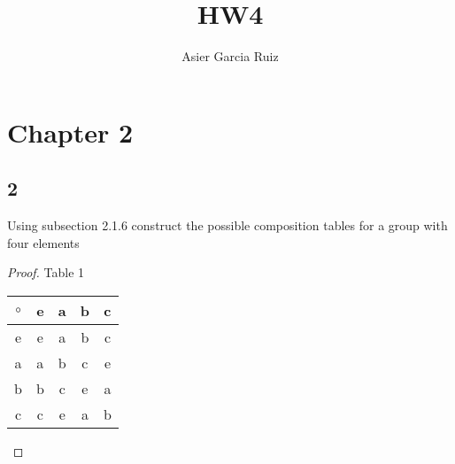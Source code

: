 \documentclass{article}
\title{HW4}
\author{Asier Garcia Ruiz}
\begin{document}
\maketitle

\section*{Chapter 2}
\subsection*{2}
Using subsection 2.1.6 construct the possible composition tables for a group with
four elements

\begin{proof}
    Table 1
    \begin{center}
        \begin{tabular}{ c | c c c c}
            $\circ$ & e & a & b & c \\
            \hline
            e       & e & a & b & c \\
            a       & a & b & c & e \\
            b       & b & c & e & a \\
            c       & c & e & a & b
        \end{tabular}
    \end{center}


\end{proof}
\end{document}
